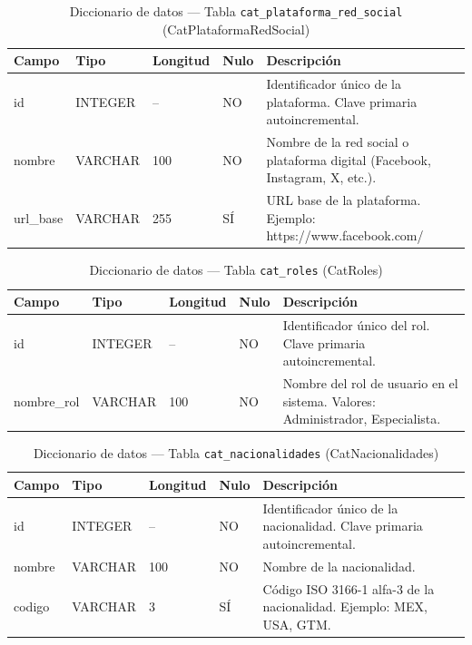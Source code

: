 \begin{table}[H]
	\centering
	\caption{Diccionario de datos --- Tabla \texttt{cat\_plataforma\_red\_social} (CatPlataformaRedSocial)}
	\label{tab:data-dict-cat_plataforma_red_social}
	\scriptsize
	\begin{tabular}{>{\ttfamily\raggedright\arraybackslash}p{3.6cm} p{1.6cm} p{1.3cm} p{0.7cm} p{5.6cm}}
		\toprule
		\textbf{Campo} & \textbf{Tipo} & \textbf{Longitud} & \textbf{Nulo} & \textbf{Descripción} \\
		\midrule
		id & INTEGER & -- & NO & Identificador único de la plataforma. Clave primaria autoincremental. \\
		nombre & VARCHAR & 100 & NO & Nombre de la red social o plataforma digital (Facebook, Instagram, X, etc.). \\
		url\_base & VARCHAR & 255 & SÍ & URL base de la plataforma. Ejemplo: https://www.facebook.com/ \\
		\bottomrule
	\end{tabular}
\end{table}

\begin{table}[H]
	\centering
	\caption{Diccionario de datos --- Tabla \texttt{cat\_roles} (CatRoles)}
	\label{tab:data-dict-cat_roles}
	\scriptsize
	\begin{tabular}{>{\ttfamily\raggedright\arraybackslash}p{3.6cm} p{1.6cm} p{1.3cm} p{0.7cm} p{5.6cm}}
		\toprule
		\textbf{Campo} & \textbf{Tipo} & \textbf{Longitud} & \textbf{Nulo} & \textbf{Descripción} \\
		\midrule
		id & INTEGER & -- & NO & Identificador único del rol. Clave primaria autoincremental. \\
		nombre\_rol & VARCHAR & 100 & NO & Nombre del rol de usuario en el sistema. Valores: Administrador, Especialista. \\
		\bottomrule
	\end{tabular}
\end{table}

\begin{table}[H]
	\centering
	\caption{Diccionario de datos --- Tabla \texttt{cat\_nacionalidades} (CatNacionalidades)}
	\label{tab:data-dict-cat_nacionalidades}
	\scriptsize
	\begin{tabular}{>{\ttfamily\raggedright\arraybackslash}p{3.6cm} p{1.6cm} p{1.3cm} p{0.7cm} p{5.6cm}}
		\toprule
		\textbf{Campo} & \textbf{Tipo} & \textbf{Longitud} & \textbf{Nulo} & \textbf{Descripción} \\
		\midrule
		id & INTEGER & -- & NO & Identificador único de la nacionalidad. Clave primaria autoincremental. \\
		nombre & VARCHAR & 100 & NO & Nombre de la nacionalidad. \\
		codigo & VARCHAR & 3 & SÍ & Código ISO 3166-1 alfa-3 de la nacionalidad. Ejemplo: MEX, USA, GTM. \\
		\bottomrule
	\end{tabular}
\end{table}

